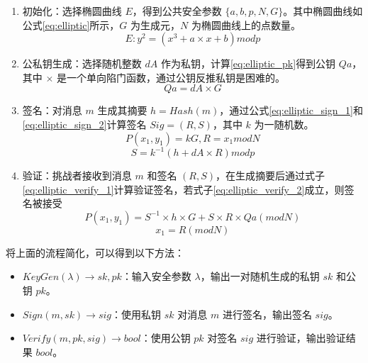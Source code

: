\begin{enumerate}
    \item 初始化：选择椭圆曲线 $E$，得到公共安全参数 $\{a, b, p, N, G\}$。其中椭圆曲线如公式\eqref{eq:elliptic}所示，$G$ 为生成元，$N$ 为椭圆曲线上的点数量。
    \begin{equation} \label{eq:elliptic} 
        E: y^2 = (x^3 + a \times x + b) mod p
    \end{equation}
    \item 公私钥生成：选择随机整数 $dA$ 作为私钥，计算\eqref{eq:elliptic_pk}得到公钥 $Qa$，其中 $\times$ 是一个单向陷门函数，通过公钥反推私钥是困难的。
    \begin{equation} \label{eq:elliptic_pk}
        Qa = dA \times G
    \end{equation}
    \item 签名：对消息 $m$ 生成其摘要 $h = Hash(m)$，通过公式\eqref{eq:elliptic_sign_1}和\eqref{eq:elliptic_sign_2}计算签名 $Sig = (R, S)$，其中 $k$ 为一随机数。
    \begin{equation} \label{eq:elliptic_sign_1}
        P(x_1, y_1) = kG, R = x_1 mod N
    \end{equation}
    \begin{equation} \label{eq:elliptic_sign_2}
        S = k^{-1} (h + dA \times R) mod p
    \end{equation}
    \item 验证：挑战者接收到消息 $m$ 和签名 $(R, S)$，在生成摘要后通过式子\eqref{eq:elliptic_verify_1}计算验证签名，若式子\eqref{eq:elliptic_verify_2}成立，则签名被接受
    \begin{equation} \label{eq:elliptic_verify_1}
        P(x_1, y_1) = S^{-1} \times h \times G + S \times R \times Qa (mod N)
    \end{equation}
    \begin{equation} \label{eq:elliptic_verify_2}
        x_1 = R (mod N)
    \end{equation}
\end{enumerate}

将上面的流程简化，可以得到以下方法：

\begin{itemize}
    \item $KeyGen(\lambda) \rightarrow sk, pk$：输入安全参数 $\lambda$，输出一对随机生成的私钥 $sk$ 和公钥 $pk$。
    \item $Sign(m, sk) \rightarrow sig$：使用私钥 $sk$ 对消息 $m$ 进行签名，输出签名 $sig$。
    \item $Verify(m, pk, sig) \rightarrow bool$：使用公钥 $pk$ 对签名 $sig$ 进行验证，输出验证结果 $bool$。
\end{itemize}

